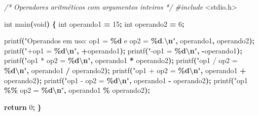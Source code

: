 \documentclass[
  11pt,
  a4paper,
]{scrbook}
\newenvironment{Shaded}{\begin{snugshade}}{\end{snugshade}}
\newcommand{\CommentTok}[1]{\textcolor[rgb]{0.56,0.35,0.01}{\textit{#1}}}
\newcommand{\ControlFlowTok}[1]{\textcolor[rgb]{0.13,0.29,0.53}{\textbf{#1}}}
\newcommand{\DataTypeTok}[1]{\textcolor[rgb]{0.13,0.29,0.53}{#1}}
\newcommand{\DecValTok}[1]{\textcolor[rgb]{0.00,0.00,0.81}{#1}}
\newcommand{\ImportTok}[1]{#1}
\newcommand{\NormalTok}[1]{#1}
\newcommand{\OperatorTok}[1]{\textcolor[rgb]{0.81,0.36,0.00}{\textbf{#1}}}
\newcommand{\PreprocessorTok}[1]{\textcolor[rgb]{0.56,0.35,0.01}{\textit{#1}}}
\newcommand{\SpecialCharTok}[1]{\textcolor[rgb]{0.81,0.36,0.00}{\textbf{#1}}}
\newcommand{\StringTok}[1]{\textcolor[rgb]{0.31,0.60,0.02}{#1}}
\begin{document}
\begin{Shaded}
\begin{Highlighting}[]
\CommentTok{/*}
\CommentTok{Operadores aritméticos com argumentos inteiros}
\CommentTok{*/}
\PreprocessorTok{\#include }\ImportTok{\textless{}stdio.h\textgreater{}}

\DataTypeTok{int}\NormalTok{ main}\OperatorTok{(}\DataTypeTok{void}\OperatorTok{)} \OperatorTok{\{}
    \DataTypeTok{int}\NormalTok{ operando1 }\OperatorTok{=} \DecValTok{15}\OperatorTok{;}
    \DataTypeTok{int}\NormalTok{ operando2 }\OperatorTok{=} \DecValTok{6}\OperatorTok{;}

\NormalTok{    printf}\OperatorTok{(}\StringTok{"Operandos em uso: op1 = }\SpecialCharTok{\%d}\StringTok{ e op2 = }\SpecialCharTok{\%d}\StringTok{.}\SpecialCharTok{\textbackslash{}n}\StringTok{"}\OperatorTok{,}\NormalTok{ operando1}\OperatorTok{,}\NormalTok{ operando2}\OperatorTok{);}
\NormalTok{    printf}\OperatorTok{(}\StringTok{"+op1 = }\SpecialCharTok{\%d\textbackslash{}n}\StringTok{"}\OperatorTok{,} \OperatorTok{+}\NormalTok{operando1}\OperatorTok{);}
\NormalTok{    printf}\OperatorTok{(}\StringTok{"{-}op1 = }\SpecialCharTok{\%d\textbackslash{}n}\StringTok{"}\OperatorTok{,} \OperatorTok{{-}}\NormalTok{operando1}\OperatorTok{);}
\NormalTok{    printf}\OperatorTok{(}\StringTok{"op1 * op2 = }\SpecialCharTok{\%d\textbackslash{}n}\StringTok{"}\OperatorTok{,}\NormalTok{ operando1 }\OperatorTok{*}\NormalTok{ operando2}\OperatorTok{);}
\NormalTok{    printf}\OperatorTok{(}\StringTok{"op1 / op2 = }\SpecialCharTok{\%d\textbackslash{}n}\StringTok{"}\OperatorTok{,}\NormalTok{ operando1 }\OperatorTok{/}\NormalTok{ operando2}\OperatorTok{);}
\NormalTok{    printf}\OperatorTok{(}\StringTok{"op1 + op2 = }\SpecialCharTok{\%d\textbackslash{}n}\StringTok{"}\OperatorTok{,}\NormalTok{ operando1 }\OperatorTok{+}\NormalTok{ operando2}\OperatorTok{);}
\NormalTok{    printf}\OperatorTok{(}\StringTok{"op1 {-} op2 = }\SpecialCharTok{\%d\textbackslash{}n}\StringTok{"}\OperatorTok{,}\NormalTok{ operando1 }\OperatorTok{{-}}\NormalTok{ operando2}\OperatorTok{);}
\NormalTok{    printf}\OperatorTok{(}\StringTok{"op1 }\SpecialCharTok{\%\%}\StringTok{ op2 = }\SpecialCharTok{\%d\textbackslash{}n}\StringTok{"}\OperatorTok{,}\NormalTok{ operando1 }\OperatorTok{\%}\NormalTok{ operando2}\OperatorTok{);}

    \ControlFlowTok{return} \DecValTok{0}\OperatorTok{;}
\OperatorTok{\}}
\end{Highlighting}
\end{Shaded}
\end{document}
